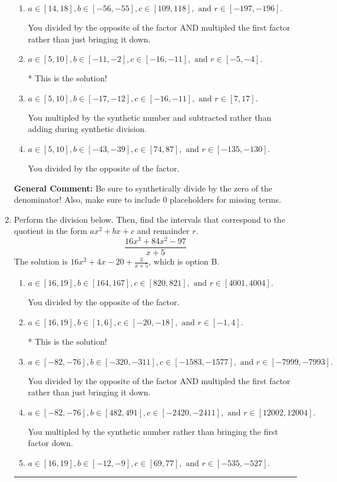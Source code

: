 \documentclass{extbook}[14pt]
\newcommand{\litem}[1]{\item #1

\rule{\textwidth}{0.4pt}}
\begin{document}
\begin{enumerate}
{\begin{enumerate}[label=\Alph*.]
 You multipled by the synthetic number rather than bringing the first factor down.
\item \( a \in [14, 18], b \in [-56, -55], c \in [109, 118], \text{ and } r \in [-197, -196]. \)

 You divided by the opposite of the factor AND multipled the first factor rather than just bringing it down.
\item \( a \in [5, 10], b \in [-11, -2], c \in [-16, -11], \text{ and } r \in [-5, -4]. \)

* This is the solution!
\item \( a \in [5, 10], b \in [-17, -12], c \in [-16, -11], \text{ and } r \in [7, 17]. \)

 You multipled by the synthetic number and subtracted rather than adding during synthetic division.
\item \( a \in [5, 10], b \in [-43, -39], c \in [74, 87], \text{ and } r \in [-135, -130]. \)

 You divided by the opposite of the factor.
\end{enumerate}

\textbf{General Comment:} Be sure to synthetically divide by the zero of the denominator! Also, make sure to include 0 placeholders for missing terms.
}
\litem{
Perform the division below. Then, find the intervals that correspond to the quotient in the form $ax^2+bx+c$ and remainder $r$.
\[ \frac{16x^{3} +84 x^{2} -97}{x + 5} \]The solution is \( 16x^{2} +4 x -20 + \frac{3}{x + 5} \), which is option B.\begin{enumerate}[label=\Alph*.]
\item \( a \in [16, 19], b \in [164, 167], c \in [820, 821], \text{ and } r \in [4001, 4004]. \)

 You divided by the opposite of the factor.
\item \( a \in [16, 19], b \in [1, 6], c \in [-20, -18], \text{ and } r \in [-1, 4]. \)

* This is the solution!
\item \( a \in [-82, -76], b \in [-320, -311], c \in [-1583, -1577], \text{ and } r \in [-7999, -7993]. \)

 You divided by the opposite of the factor AND multipled the first factor rather than just bringing it down.
\item \( a \in [-82, -76], b \in [482, 491], c \in [-2420, -2411], \text{ and } r \in [12002, 12004]. \)

 You multipled by the synthetic number rather than bringing the first factor down.
\item \( a \in [16, 19], b \in [-12, -9], c \in [69, 77], \text{ and } r \in [-535, -527]. \)


\end{enumerate}}
\end{enumerate}
\end{document}
